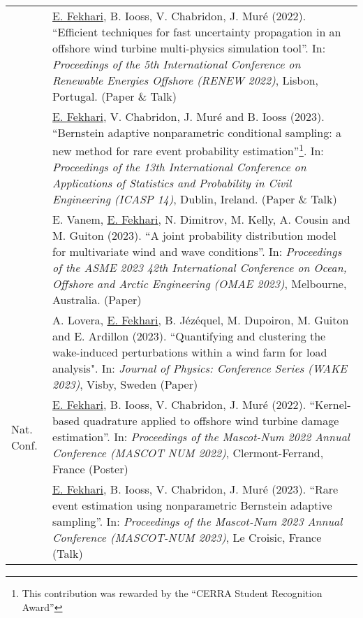 \begin{center}
\begin{tabularx}{\textwidth}{l X}
                    & \underline{E. Fekhari}, B. Iooss, V. Chabridon, J. Muré (2022). 
                    ``Efficient techniques for fast uncertainty propagation in an offshore wind turbine multi-physics simulation tool''.
                    In: \textit{Proceedings of the 5th International Conference on Renewable Energies Offshore (RENEW 2022)}, Lisbon, Portugal. (Paper \& Talk)\\
        
                    & \underline{E. Fekhari}, V. Chabridon, J. Muré and B. Iooss (2023). 
                    ``Bernstein adaptive nonparametric conditional sampling: a new method for rare event probability estimation''\footnote{This contribution was rewarded by the ``CERRA Student Recognition Award''}.
                    In: \textit{Proceedings of the 13th International Conference on Applications of Statistics and Probability in Civil Engineering (ICASP 14)}, Dublin, Ireland. (Paper \& Talk)\\
        
                    & E. Vanem, \underline{E. Fekhari}, N. Dimitrov, M. Kelly, A. Cousin and M. Guiton (2023). 
                    ``A joint probability distribution model for multivariate wind and wave conditions''.
                    In: \textit{Proceedings of the ASME 2023 42th International Conference on Ocean, Offshore and Arctic Engineering (OMAE 2023)}, Melbourne, Australia. (Paper)\\
        
                    & A. Lovera, \underline{E. Fekhari}, B. Jézéquel, M. Dupoiron, M. Guiton and E. Ardillon (2023). 
                    ``Quantifying and clustering the wake-induced perturbations within a wind farm for load analysis". 
                    In: \textit{Journal of Physics: Conference Series (WAKE 2023)}, Visby, Sweden (Paper)\\
        \hline
        Nat. Conf.  & \underline{E. Fekhari}, B. Iooss, V. Chabridon, J. Muré (2022).
                    ``Kernel-based quadrature applied to offshore wind turbine damage estimation''. 
                    In: \textit{Proceedings of the Mascot-Num 2022 Annual Conference (MASCOT NUM 2022)}, Clermont-Ferrand, France (Poster)\\
        
                    & \underline{E. Fekhari}, B. Iooss, V. Chabridon, J. Muré (2023).
                    ``Rare event estimation using nonparametric Bernstein adaptive sampling''. 
                    In: \textit{Proceedings of the Mascot-Num 2023 Annual Conference (MASCOT-NUM 2023)}, Le Croisic, France (Talk)\\
                    
        \end{tabularx}    
\end{center}

